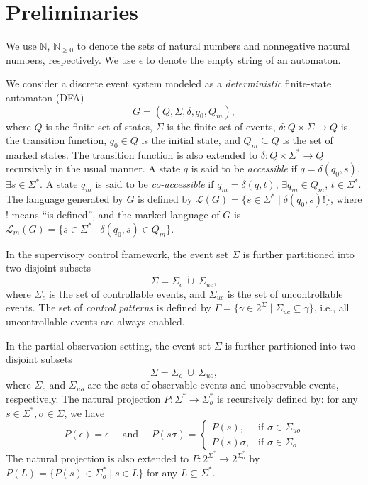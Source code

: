 \documentclass[twocolumn]{autart}
\begin{document}
\newpage

\section{Preliminaries}\label{sec:prelimi}
 
We use $\mathbb{N}$, $\mathbb{N}_{\geq 0}$ to denote the sets of natural numbers and nonnegative natural numbers, respectively. 
We use $\epsilon$ to denote the empty string of an automaton. 
 

We consider a discrete event system  modeled as a \emph{deterministic} finite-state automaton (DFA)  
    $$
        G = (Q, \Sigma, \delta, q_0, Q_m),
    $$
    where
    $Q$ is the finite set of states, 
    $\Sigma$ is the finite set of events, 
    $\delta: Q \times \Sigma \to Q$ is the   transition function,
    $q_0\in Q$ is the initial state, 
    and $Q_m\subseteq Q$ is the set of marked states. 
The transition function is also extended to 
$\delta:Q\times \Sigma^* \to Q$ recursively in the usual manner. 
A state $q$ is said to be \emph{accessible} if $q = \delta(q_0, s)$, $\exists s \in \Sigma^*$.
A state $q_m$ is said to be \emph{co-accessible} if $q_m = \delta(q, t)$, $\exists q_m \in Q_m$, $t \in \Sigma^*$.
The language generated by $G$ is defined by 
$\mathcal{L}(G) = \{ s \in \Sigma^* \mid \delta(q_0, s)! \}$, where $!$ means ``is defined'', and the marked language of $G$ is 
$\mathcal{L}_m(G) = \{ s \in \Sigma^* \mid \delta(q_0, s) \in Q_m \}$. 

In the supervisory control framework, 
the event set $\Sigma$ is further partitioned into two disjoint subsets
$$
\Sigma = \Sigma_c \ \dot{\cup} \ \Sigma_{uc},
$$
where $\Sigma_c$ is the set of controllable events, and $\Sigma_{uc}$ is the set of uncontrollable events. 
The set of \emph{control patterns} is defined by $\Gamma = \{\gamma\in 2^\Sigma \mid \Sigma_{uc}\subseteq \gamma \}$,  i.e., all uncontrollable events are always enabled. 


In the partial observation setting, the event set $\Sigma$ is further  partitioned into two disjoint subsets 
$$
\Sigma = \Sigma_o \ \dot{\cup} \ \Sigma_{uo},
$$
where $\Sigma_o$ and $\Sigma_{uo}$ are the sets of observable events and unobservable events, respectively. 
The natural projection $P : \Sigma^* \rightarrow \Sigma_{o}^*$ is recursively defined by: for any $s\in\Sigma^*,\sigma\in\Sigma$, we have
\begin{equation}
P(\epsilon)  = \epsilon\quad \text{ and }\quad 
P(s \sigma) =
\begin{cases}
P(s), & \text{if } \sigma \in \Sigma_{uo} \\
P(s)\sigma,  & \text{if } \sigma \in \Sigma_{o}
\end{cases}
\label{eq:proj}
\end{equation} 
The natural projection is also extended to $P:2^{\Sigma^*}\to 2^{\Sigma_o^*}$ by $P(L)=\{P(s)\in \Sigma_o^* \mid s\in L\}$  for any $L\subseteq\Sigma^*$. 
    
\end{document}
